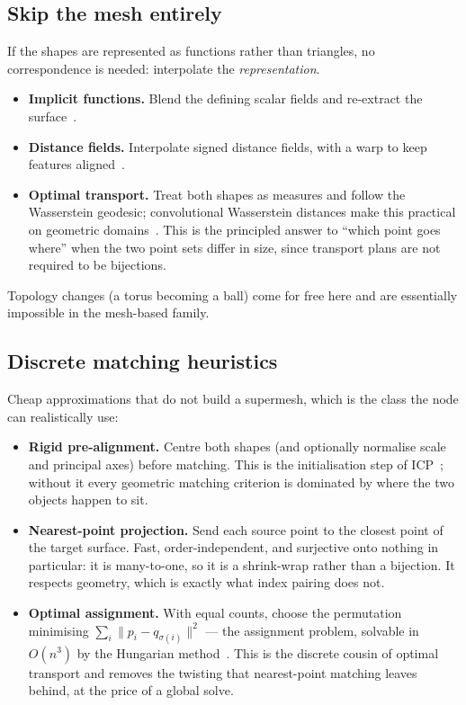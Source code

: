 \documentclass[11pt,a4paper]{article}
\begin{document}
\subsection{Skip the mesh entirely}

If the shapes are represented as functions rather than triangles, no
correspondence is needed: interpolate the \emph{representation}.

\begin{itemize}[leftmargin=1.4em]
  \item \textbf{Implicit functions.} Blend the defining scalar fields and
    re-extract the surface~\cite{turk1999}.
  \item \textbf{Distance fields.} Interpolate signed distance fields, with
    a warp to keep features aligned~\cite{cohenor1998}.
  \item \textbf{Optimal transport.} Treat both shapes as measures and
    follow the Wasserstein geodesic; convolutional Wasserstein distances
    make this practical on geometric domains~\cite{solomon2015}. This is
    the principled answer to ``which point goes where'' when the two point
    sets differ in size, since transport plans are not required to be
    bijections.
\end{itemize}

Topology changes (a torus becoming a ball) come for free here and are
essentially impossible in the mesh-based family.

\subsection{Discrete matching heuristics}

Cheap approximations that do not build a supermesh, which is the class the
node can realistically use:

\begin{itemize}[leftmargin=1.4em]
  \item \textbf{Rigid pre-alignment.} Centre both shapes (and optionally
    normalise scale and principal axes) before matching. This is the
    initialisation step of ICP~\cite{besl1992}; without it every geometric
    matching criterion is dominated by where the two objects happen to sit.
  \item \textbf{Nearest-point projection.} Send each source point to the
    closest point of the target surface. Fast, order-independent, and
    surjective onto nothing in particular: it is many-to-one, so it is a
    shrink-wrap rather than a bijection. It respects geometry, which is
    exactly what index pairing does not.
  \item \textbf{Optimal assignment.} With equal counts, choose the
    permutation minimising $\sum_i \|p_i - q_{\sigma(i)}\|^2$ --- the
    assignment problem, solvable in $O(n^3)$ by the Hungarian
    method~\cite{kuhn1955}. This is the discrete cousin of optimal
    transport and removes the twisting that nearest-point matching leaves
    behind, at the price of a global solve.
\end{itemize}
\end{document}
